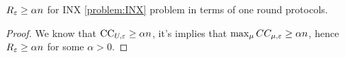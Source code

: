 \begin{crly}
	$R_\varepsilon \geq \alpha n$ for INX \ref{problem:INX} problem in terms of one round protocols.
\end{crly}
\begin{proof}
		We know that $\operatorname{CC}_{U, \varepsilon} \geq \alpha n$, it's implies that $\max_\mu CC_{\mu, \varepsilon} \geq \alpha n$, hence $R_\varepsilon \geq \alpha n$ for some $\alpha > 0$.
\end{proof}


